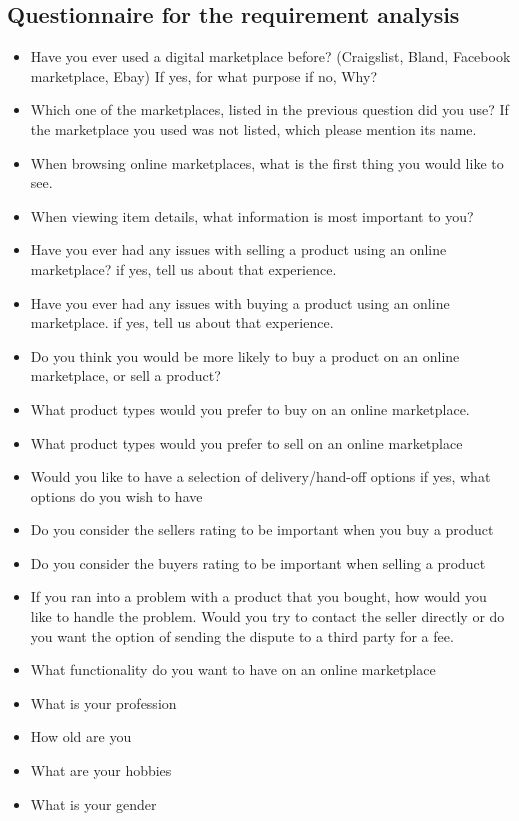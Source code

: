 \subsection{Questionnaire for the requirement analysis}
\begin{itemize}
    \item Have you ever used a digital marketplace before? (Craigslist, Bland, Facebook marketplace, Ebay)
    \subitem If yes, for what purpose
    \subitem if no, Why?
    \item Which one of the marketplaces, listed in the previous question did you use?
    \subitem If the marketplace you used was not listed, which please mention its name.
    \item When browsing online marketplaces, what is the first thing you would like to see.
    \item When viewing item details, what information is most important to you?
    \item Have you ever had any issues with selling a product using an online marketplace?
    \subitem if yes, tell us about that experience.
    \item Have you ever had any issues with buying a product using an online marketplace.
    \subitem if yes, tell us about that experience.
    \item Do you think you would be more likely to buy a product on an online marketplace, or sell a product?
    \item What product types would you prefer to buy on an online marketplace.
    \item What product types would you prefer to sell on an online marketplace
    \item Would you like to have a selection of delivery/hand-off options
    \subitem if yes, what options do you wish to have
    \item Do you consider the sellers rating to be important when you buy a product
    \item Do you consider the buyers rating to be important when selling a product
    \item If you ran into a problem with a product that you bought, how would you like to handle the problem. Would you try to contact the seller directly or do you want the option of sending the dispute to a third party for a fee.
    \item What functionality do you want to have on an online marketplace
    \item What is your profession
    \item How old are you
    \item What are your hobbies
    \item What is your gender
\end{itemize}
